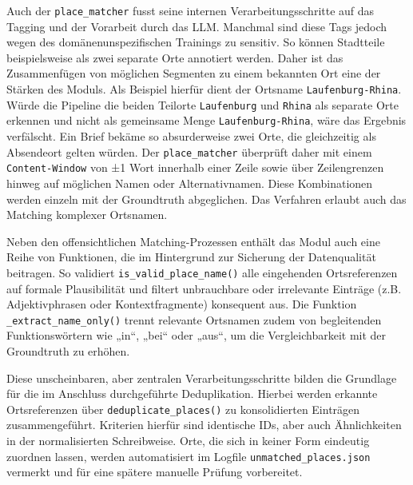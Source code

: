 \documentclass[12pt, a4paper, ngerman, bidi=default]{article}
\newcommand{\code}[1]{\colorbox{VeryLightGray}{\texttt{#1}}} %
\begin{document}
Auch der \code{place\_matcher} fusst seine internen Verarbeitungsschritte auf das Tagging und der Vorarbeit durch das LLM. Manchmal sind diese Tags jedoch wegen des domänenunspezifischen Trainings zu sensitiv. So können Stadtteile beispielsweise als zwei separate Orte annotiert werden.
Daher ist das Zusammenfügen von möglichen Segmenten zu einem bekannten Ort eine der Stärken des Moduls. Als Beispiel hierfür dient der Ortsname \texttt{Laufenburg-Rhina}. Würde die Pipeline die beiden Teilorte \texttt{Laufenburg} und \texttt{Rhina} als separate Orte erkennen und nicht als gemeinsame Menge \texttt{Laufenburg-Rhina}, wäre das Ergebnis verfälscht. Ein Brief bekäme so absurderweise zwei Orte, die gleichzeitig als Absendeort gelten würden. 
Der \code{place\_matcher} überprüft daher mit einem \code{Content-Window} von  ±1 Wort innerhalb einer Zeile sowie über Zeilengrenzen hinweg auf möglichen Namen oder Alternativnamen. Diese Kombinationen werden einzeln mit der Groundtruth abgeglichen. Das Verfahren erlaubt auch das Matching komplexer Ortsnamen.

Neben den offensichtlichen Matching-Prozessen enthält das Modul auch eine Reihe von Funktionen, die im Hintergrund zur Sicherung der Datenqualität beitragen. So validiert \code{is\_valid\_place\_name()} alle eingehenden Ortsreferenzen auf formale Plausibilität und filtert unbrauchbare oder irrelevante Einträge (z.B. Adjektivphrasen oder Kontextfragmente) konsequent aus. Die Funktion \code{\_extract\_name\_only()} trennt relevante Ortsnamen zudem von begleitenden Funktionswörtern wie „in“, „bei“ oder „aus“, um die Vergleichbarkeit mit der Groundtruth zu erhöhen.

Diese unscheinbaren, aber zentralen Verarbeitungsschritte bilden die Grundlage für die im Anschluss durchgeführte Deduplikation. Hierbei werden erkannte Ortsreferenzen über \code{deduplicate\_places()} zu konsolidierten Einträgen zusammengeführt. Kriterien hierfür sind identische IDs, aber auch Ähnlichkeiten in der normalisierten Schreibweise. Orte, die sich in keiner Form eindeutig zuordnen lassen, werden automatisiert im Logfile \code{unmatched\_places.json} vermerkt und für eine spätere manuelle Prüfung vorbereitet.
\end{document}
